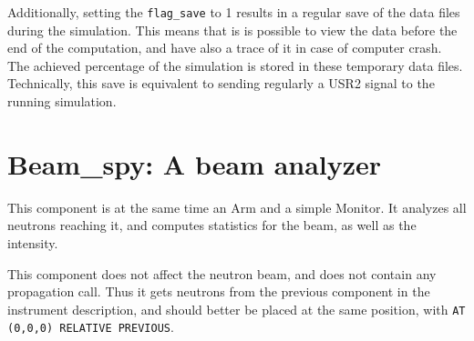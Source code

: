 Additionally, setting the \verb+flag_save+ to 1 results in
a regular save of the data files during the simulation.
This means that is is possible to view the data before the end
of the computation, and have also a trace of it in case of
computer crash. The achieved percentage of the simulation is stored in these temporary
data files. Technically, this save is equivalent to sending regularly
a USR2 signal to the running simulation.

\section{Beam\_spy: A beam analyzer}

This component is at the same time an Arm and a simple Monitor. It analyzes all neutrons reaching it, and computes statistics for the beam, as well as the intensity.

This component does not affect the neutron beam, and does not contain any propagation call. Thus it gets neutrons from the previous component in the instrument description, and should better be placed at the same position, with \verb+AT (0,0,0) RELATIVE PREVIOUS+.